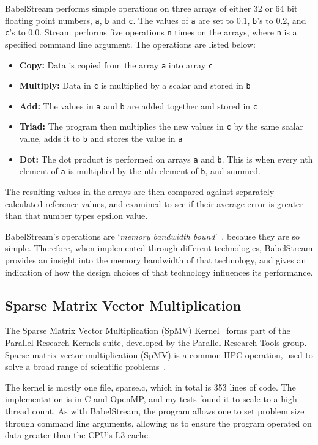 BabelStream performs simple operations on three arrays of either 32 or 64 bit floating point numbers, \texttt{a}, \texttt{b} and \texttt{c}. The values of \texttt{a} are set to 0.1, \texttt{b}'s to 0.2, and \texttt{c}'s to 0.0. Stream performs five operations \texttt{n} times on the arrays, where \texttt{n} is a specified command line argument. The operations are listed below:
\begin{itemize}
  \item \textbf{Copy:} Data is copied from the array \texttt{a} into array \texttt{c}
  \item \textbf{Multiply:} Data in \texttt{c} is multiplied by a scalar and stored in \texttt{b}
  \item \textbf{Add:} The values in \texttt{a} and \texttt{b} are added together and stored in \texttt{c}
  \item \textbf{Triad:} The program then multiplies the new values in \texttt{c} by the same scalar value, adds it to \texttt{b} and stores the value in \texttt{a}
  \item \textbf{Dot:} The dot product is performed on arrays \texttt{a} and \texttt{b}. This is when every nth element of \texttt{a} is multiplied by the nth element of \texttt{b}, and summed.
\end{itemize}
The resulting values in the arrays are then compared against separately calculated reference values, and examined to see if their average error is greater than that number types epsilon value.

BabelStream's operations are `\textit{memory bandwidth bound}'~\cite{BabelStream}, because they are so simple. Therefore, when implemented through different technologies, BabelStream provides an insight into the memory bandwidth of that technology, and gives an indication of how the design choices of that technology influences its performance.

\subsection{Sparse Matrix Vector Multiplication}

The Sparse Matrix Vector Multiplication (SpMV) Kernel~\cite{ParResSparse} forms part of the Parallel Research Kernels suite, developed by the Parallel Research Tools group. Sparse matrix vector multiplication (SpMV) is a common HPC operation, used to solve a broad range of scientific problems~\cite{Sedaghati:2015, spMVGPU, DBLP:journals}.

The kernel is mostly one file, sparse.c, which in total is 353 lines of code. The implementation is in C and OpenMP, and my tests found it to scale to a high thread count. As with BabelStream, the program allows one to set problem size through command line arguments, allowing us to ensure the program operated on data greater than the CPU's L3 cache.


